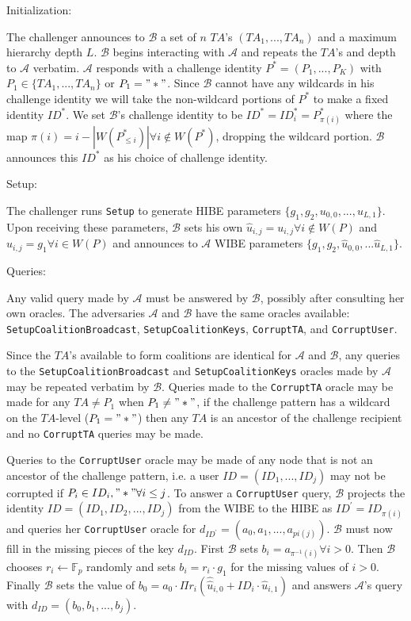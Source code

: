 \documentclass[10pt]{article}
\newcommand{\A}{\mathcal{A}}
\newcommand{\B}{\mathcal{B}}
\newcommand{\TA}{\mathit{TA}}
\begin{document}
Initialization:

The challenger announces to $\B$ a set of $n$ $\TA$'s $(\TA_1, ..., \TA_n)$ and a maximum hierarchy depth $L$. $\B$ begins interacting with $\A$ and repeats the $\TA$'s and depth to $\A$ verbatim.  $\A$ responds with a challenge identity $P^* = (P_1, ..., P_K)$ with $P_1 \in \{\TA_1, ..., \TA_n\}$ or $P_1 = "*"$.  Since $\B$ cannot have any wildcards in his challenge identity we will take the non-wildcard portions of $P^*$ to make a fixed identity $ID^*$.  We set $\B$'s challenge identity to be $ID^* = {ID^*_i} = P^*_{\pi(i)}$ where the map $\pi(i) = i - |W(P^*_{\le i})| \forall i \not\in W(P^*)$, dropping the wildcard portion.  $\B$ announces this $ID^*$ as his choice of challenge identity.

Setup:

The challenger runs \texttt{Setup} to generate HIBE parameters $\{g_1, g_2, u_{0,0}, ..., u_{L,1}\}$.  Upon receiving these parameters, $\B$ sets his own $\hat u_{i, j} = u_{i,j} \forall i \not\in W(P)$ and $\hat u_{i,j} = g_1 \forall i \in W(P)$ and announces to $\A$ WIBE parameters $\{g_1, g_2, \hat u_{0,0}, ... \hat u_{L,1}\}$.

Queries:

Any valid query made by $\A$ must be answered by $\B$, possibly after consulting her own oracles.  The adversaries $\A$ and $\B$ have the same oracles available: \texttt{SetupCoalitionBroadcast}, \texttt{SetupCoalitionKeys}, \texttt{CorruptTA}, and \texttt{CorruptUser}.

Since the $\TA$'s available to form coalitions are identical for $\A$ and $\B$, any queries to the \texttt{SetupCoalitionBroadcast} and \texttt{SetupCoalitionKeys} oracles made by $\A$ may be repeated verbatim by $\B$.  Queries made to the \texttt{CorruptTA} oracle may be made for any $\TA \neq P_1$ when $P_1 \neq "*"$, if the challenge pattern has a wildcard on the $\TA$-level ($P_1 = "*"$) then any $\TA$ is an ancestor of the challenge recipient and no \texttt{CorruptTA} queries may be made.

Queries to the \texttt{CorruptUser} oracle may be made of any node that is not an ancestor of the challenge pattern, i.e. a user $ID = (ID_1, ..., ID_j)$ may not be corrupted if $P_i \in {ID_i, "*"} \forall i \le j$. To answer a \texttt{CorruptUser} query, $\B$ projects the identity $ID = (ID_1, ID_2, ..., ID_j)$ from the WIBE to the HIBE as $ID^\prime = ID_{\pi(i)}$ and queries her \texttt{CorruptUser} oracle for $d_{ID^\prime} = (a_0, a_1, ..., a_{pi(j)})$.  $\B$ must now fill in the missing pieces of the key $d_{ID}$.  First $\B$ sets $b_i = a_{\pi^{-1}(i)} \forall i > 0$.  Then $\B$ chooses $r_i \leftarrow \mathbb{F}_p$ randomly and sets $b_i = r_i \cdot g_1$ for the missing values of $i > 0$.  Finally $\B$ sets the value of $b_0 = a_0 \cdot \Pi r_i(\hat \hat u_{i,0} + ID_i \cdot \hat u_{i,1})$ and answers $\A$'s query with $d_{ID} = (b_0, b_1, ..., b_j)$.
\end{document}
